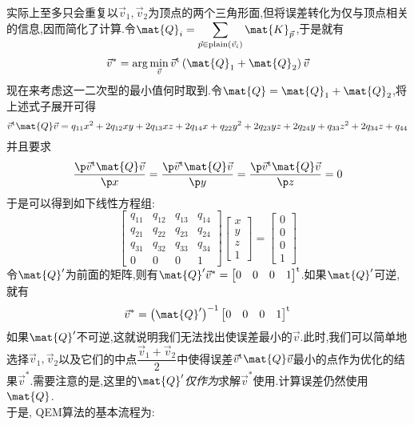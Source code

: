 \documentclass{ctexart}
\begin{document}
实际上至多只会重复以$\vec{v}_1,\vec{v}_2$为顶点的两个三角形面,但将误差转化为仅与顶点相关的信息,因而简化了计算.令$\mat{Q}_i=\displaystyle\sum_{\vec{p}\in\text{plain}\left(\vec{v}_i\right)}\mat{K}_{\vec{p}}$,于是就有
\[\vec{v}^\ast=\arg\min_{\vec{v}}\vec{v}^{\text{t}}\left(\mat{Q}_1+\mat{Q}_2\right)\vec{v}\]
现在来考虑这一二次型的最小值何时取到.令$\mat{Q}=\mat{Q}_1+\mat{Q}_2$,将上述式子展开可得
\[\vec{v}^{\text{t}}\mat{Q}\vec{v}=q_{11}x^2+2q_{12}xy+2q_{13}xz+2q_{14}x+q_{22}y^2+2q_{23}yz+2q_{24}y+q_{33}z^2+2q_{34}z+q_{44}\]
并且要求
\[\dfrac{\p\vec{v}^{\text{t}}\mat{Q}\vec{v}}{\p x}=\dfrac{\p\vec{v}^{\text{t}}\mat{Q}\vec{v}}{\p y}=\dfrac{\p\vec{v}^{\text{t}}\mat{Q}\vec{v}}{\p z}=0\]
于是可以得到如下线性方程组:
\[\begin{bmatrix}
    q_{11}&q_{12}&q_{13}&q_{14}\\
    q_{21}&q_{22}&q_{23}&q_{24}\\
    q_{31}&q_{32}&q_{33}&q_{34}\\
    0&0&0&1
\end{bmatrix}\begin{bmatrix}
    x\\y\\z\\1
\end{bmatrix}=\begin{bmatrix}
    0\\0\\0\\1
\end{bmatrix}\]
令$\mat{Q}'$为前面的矩阵,则有$\mat{Q}'\vec{v}^\ast=\begin{bmatrix}
    0&0&0&1
\end{bmatrix}^{\text{t}}$.如果$\mat{Q}'$可逆,就有
\[\vec{v}^\ast=\left(\mat{Q}'\right)^{-1}\begin{bmatrix}
    0&0&0&1
\end{bmatrix}^{\text{t}}\]
如果$\mat{Q}'$不可逆,这就说明我们无法找出使误差最小的$\vec{v}$.此时,我们可以简单地选择$\vec{v}_1,\vec{v}_2$以及它们的中点$\dfrac{\vec{v}_1+\vec{v}_2}{2}$中使得误差$\vec{v}^{\text{t}}\mat{Q}\vec{v}$最小的点作为优化的结果$\vec{v}^\ast$.需要注意的是,这里的$\mat{Q}'$\textit{仅作为}求解$\vec{v}^\ast$使用.计算误差仍然使用$\mat{Q}$.\\
\indent 于是, QEM算法的基本流程为:
\end{document}
